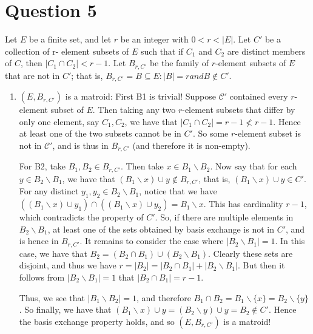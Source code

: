 \documentclass{article}
\begin{document}
\section*{Question 5}
Let $E$ be a finite set, and let $r$ be an integer with $0 < r < |E|$. Let $C'$ be a collection of r-
element subsets of $E$ such that if $C_1$ and $C_2$ are distinct members of $C$, then $|C_1 \cap C_2| <
r - 1$. Let $B_{r,C'}$ be the family of $r$-element subsets of $E$ that are not in $C'$; that is,
$B_{r, C'} = {B \subseteq E : |B| = r and B \not\in C'}.$
\begin{enumerate}
    \item $(E, B_{r, C'})$ is a matroid: First B1 is trivial! Suppose $\mathcal{C}'$ contained every $r$-element subset of $E$. Then taking any two $r$-element 
        subsets that differ by only one element, say $C_1, C_2$, we have that $|C_1\cap C_2|=r-1\not<r-1$. Hence at least one of the two subsets
        cannot be in $C'$. So some $r$-element subset is not in $\mathcal{C}'$,
        and is thus in $B_{r, C'}$ (and therefore it is non-empty).

        For B2, take $B_1, B_2\in B_{r, C'}$. Then take $x\in B_1\backslash B_2$. Now say that for each $y\in B_2\backslash B_1$, we have that $(B_1\backslash x)\cup y\not\in B_{r, C'}$,
        that is, $(B_1\backslash x)\cup y\in C'$. For any distinct $y_1, y_2\in B_2\backslash B_1$, notice that we have $((B_1\backslash x)\cup y_1)\cap ((B_1\backslash x)\cup y_2)= B_1\backslash x$.
        This has cardinality $r-1$, which contradicts the property of $C'$. So, if there are multiple elements in $B_2\backslash B_1$, at least one of the 
        sets obtained by basis exchange is not in $C'$, and is hence in $B_{r, C'}$. It remains to consider the case where $|B_2\backslash B_1|=1$.
        In this case, we have that $B_2 = (B_2\cap B_1)\cup (B_2\backslash B_1)$. Clearly these sets are disjoint, and thus we have $r=|B_2|=|B_2\cap B_1|+ |B_2\backslash B_1|$.
        But then it follows from $|B_2\backslash B_1|=1$ that $|B_2\cap B_1|=r-1$.

        Thus, we see that $|B_1\backslash B_2|=1$, and therefore $B_1\cap B_2=B_1\backslash \{x\}= B_2\backslash \{y\}$.
        So finally, we have that $(B_1\backslash x)\cup y= (B_2\backslash y)\cup y= B_2\not\in C'$. Hence the basis exchange property holds, and so $(E, B_{r, C'})$ is a matroid!



\end{enumerate}
\end{document}
